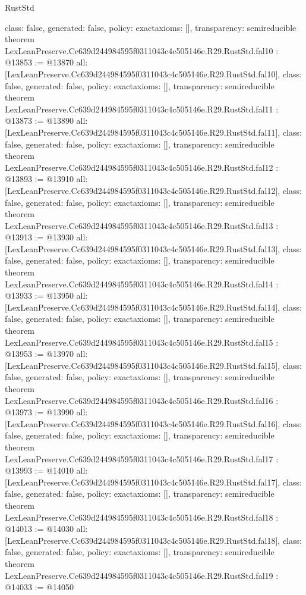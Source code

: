 \begin{lexlean}{RustStd}
\begin{coremodule}
{  class: false,
  generated: false,
  policy: exact{axioms: []},
  transparency: semireducible
}
theorem LexLeanPreserve.Cc639d244984595f0311043c4c505146e.R29.RustStd.fal10 : @13853 := @13870 {
  all: [LexLeanPreserve.Cc639d244984595f0311043c4c505146e.R29.RustStd.fal10],
  class: false,
  generated: false,
  policy: exact{axioms: []},
  transparency: semireducible
}
theorem LexLeanPreserve.Cc639d244984595f0311043c4c505146e.R29.RustStd.fal11 : @13873 := @13890 {
  all: [LexLeanPreserve.Cc639d244984595f0311043c4c505146e.R29.RustStd.fal11],
  class: false,
  generated: false,
  policy: exact{axioms: []},
  transparency: semireducible
}
theorem LexLeanPreserve.Cc639d244984595f0311043c4c505146e.R29.RustStd.fal12 : @13893 := @13910 {
  all: [LexLeanPreserve.Cc639d244984595f0311043c4c505146e.R29.RustStd.fal12],
  class: false,
  generated: false,
  policy: exact{axioms: []},
  transparency: semireducible
}
theorem LexLeanPreserve.Cc639d244984595f0311043c4c505146e.R29.RustStd.fal13 : @13913 := @13930 {
  all: [LexLeanPreserve.Cc639d244984595f0311043c4c505146e.R29.RustStd.fal13],
  class: false,
  generated: false,
  policy: exact{axioms: []},
  transparency: semireducible
}
theorem LexLeanPreserve.Cc639d244984595f0311043c4c505146e.R29.RustStd.fal14 : @13933 := @13950 {
  all: [LexLeanPreserve.Cc639d244984595f0311043c4c505146e.R29.RustStd.fal14],
  class: false,
  generated: false,
  policy: exact{axioms: []},
  transparency: semireducible
}
theorem LexLeanPreserve.Cc639d244984595f0311043c4c505146e.R29.RustStd.fal15 : @13953 := @13970 {
  all: [LexLeanPreserve.Cc639d244984595f0311043c4c505146e.R29.RustStd.fal15],
  class: false,
  generated: false,
  policy: exact{axioms: []},
  transparency: semireducible
}
theorem LexLeanPreserve.Cc639d244984595f0311043c4c505146e.R29.RustStd.fal16 : @13973 := @13990 {
  all: [LexLeanPreserve.Cc639d244984595f0311043c4c505146e.R29.RustStd.fal16],
  class: false,
  generated: false,
  policy: exact{axioms: []},
  transparency: semireducible
}
theorem LexLeanPreserve.Cc639d244984595f0311043c4c505146e.R29.RustStd.fal17 : @13993 := @14010 {
  all: [LexLeanPreserve.Cc639d244984595f0311043c4c505146e.R29.RustStd.fal17],
  class: false,
  generated: false,
  policy: exact{axioms: []},
  transparency: semireducible
}
theorem LexLeanPreserve.Cc639d244984595f0311043c4c505146e.R29.RustStd.fal18 : @14013 := @14030 {
  all: [LexLeanPreserve.Cc639d244984595f0311043c4c505146e.R29.RustStd.fal18],
  class: false,
  generated: false,
  policy: exact{axioms: []},
  transparency: semireducible
}
theorem LexLeanPreserve.Cc639d244984595f0311043c4c505146e.R29.RustStd.fal19 : @14033 := @14050 {
}
\end{coremodule}
\end{lexlean}
